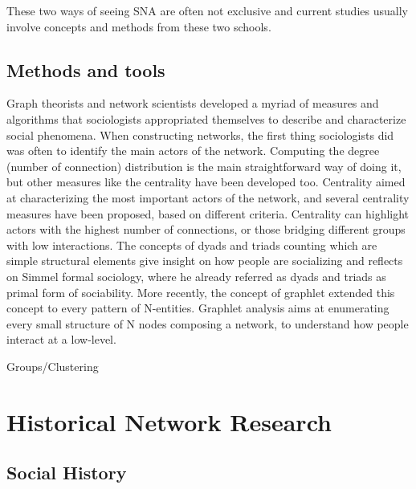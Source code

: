 These two ways of seeing SNA are often not exclusive and current studies usually involve concepts and methods from these two schools.

\subsection{Methods and tools}

Graph theorists and network scientists developed a myriad of measures and algorithms that sociologists appropriated themselves to describe and characterize social phenomena.
When constructing networks, the first thing sociologists did was often to identify the main actors of the network. Computing the degree (number of connection) distribution is the main straightforward way of doing it, but other measures like the centrality have been developed too. Centrality aimed at characterizing the most important actors of the network, and several centrality measures have been proposed, based on different criteria. Centrality can highlight actors with the highest number of connections, or those bridging different groups with low interactions.
The concepts of dyads and triads counting which are simple structural elements give insight on how people are socializing and reflects on Simmel formal sociology, where he already referred as dyads and triads as primal form of sociability. More recently, the concept of graphlet extended this concept to every pattern of N-entities. Graphlet analysis aims at enumerating every small structure of N nodes composing a network, to understand how people interact at a low-level.


Groups/Clustering







\section{Historical Network Research}

\subsection{Social History}


